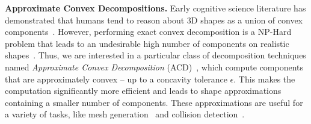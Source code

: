 \vspace{2mm}
\noindent\textbf{Approximate Convex Decompositions.} 
Early cognitive science literature has demonstrated that humans tend to reason about 3D shapes as a union
of convex components~\cite{hoffman1983parts}. 
However, performing exact convex decomposition is a NP-Hard problem that leads to an undesirable high number of
components on realistic shapes~\cite{ecd}.
Thus, we are interested in a particular class of decomposition techniques named \emph{Approximate Convex Decomposition} (ACD)~\cite{acd,minimumncd,acanalysis,vhacd},
which compute components that are approximately convex -- 
up to a concavity tolerance $\epsilon$.
This makes the computation significantly more efficient and leads to shape approximations containing
a smaller number of components.
These approximations are useful for a variety of tasks, like mesh generation~\cite{acd} and collision detection~\cite{collisiondetection}.
